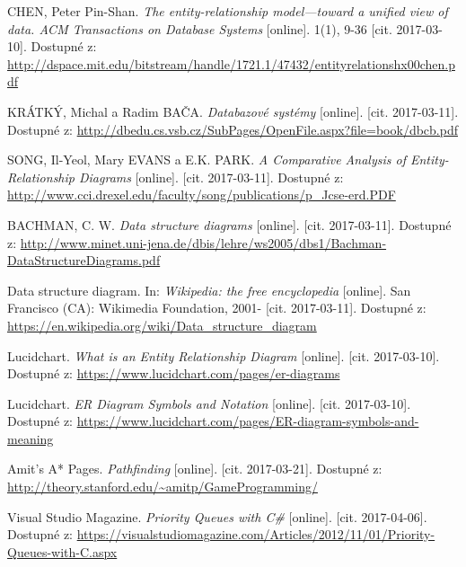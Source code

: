 \documentclass[czech,bachelor,public,dept460,male,oneside]{diploma}
\begin{document}
\newpage
\begin{thebibliography}{99}
	 CHEN, Peter Pin-Shan. \textit{The entity-relationship model---toward a unified view of data. ACM Transactions on Database Systems} [online]. 1(1), 9-36 [cit. 2017-03-10]. Dostupné z: \url{http://dspace.mit.edu/bitstream/handle/1721.1/47432/entityrelationshx00chen.pdf}
	
	 KRÁTKÝ, Michal a Radim BAČA. \textit{Databazové systémy} [online]. [cit. 2017-03-11]. Dostupné z: \url{http://dbedu.cs.vsb.cz/SubPages/OpenFile.aspx?file=book/dbcb.pdf}
	
	 SONG, Il-Yeol, Mary EVANS a E.K. PARK. \textit{A Comparative Analysis of Entity-Relationship Diagrams} [online]. [cit. 2017-03-11]. Dostupné z: \url{http://www.cci.drexel.edu/faculty/song/publications/p_Jcse-erd.PDF}
	
	 BACHMAN, C. W. \textit{Data structure diagrams} [online]. [cit. 2017-03-11]. Dostupné z: \url{http://www.minet.uni-jena.de/dbis/lehre/ws2005/dbs1/Bachman-DataStructureDiagrams.pdf}
	
	 Data structure diagram. In: \textit{Wikipedia: the free encyclopedia} [online]. San Francisco (CA): Wikimedia Foundation, 2001- [cit. 2017-03-11]. Dostupné z: \url{https://en.wikipedia.org/wiki/Data_structure_diagram}
	
	Lucidchart. \textit{What is an Entity Relationship Diagram} [online]. [cit. 2017-03-10]. Dostupné z: \url{https://www.lucidchart.com/pages/er-diagrams}
	
	Lucidchart. \textit{ER Diagram Symbols and Notation} [online]. [cit. 2017-03-10]. Dostupné z: \url{https://www.lucidchart.com/pages/ER-diagram-symbols-and-meaning}
	
	Amit’s A* Pages. \textit{Pathfinding} [online]. [cit. 2017-03-21]. Dostupné z: \url{http://theory.stanford.edu/~amitp/GameProgramming/}
	
	Visual Studio Magazine. \textit{Priority Queues with C\#} [online]. [cit. 2017-04-06]. Dostupné z: \url{https://visualstudiomagazine.com/Articles/2012/11/01/Priority-Queues-with-C.aspx}
	
	
\end{thebibliography}


\appendix
\end{document}
